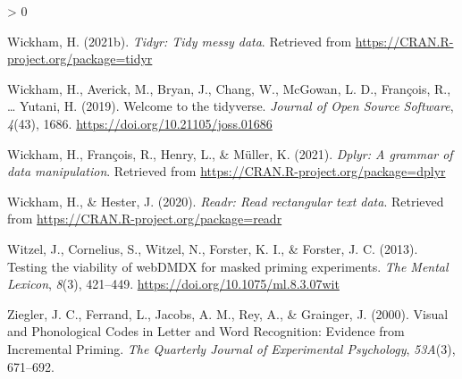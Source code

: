 \documentclass[
  english,
  man]{apa6}
\newlength{\cslhangindent}
\newenvironment{CSLReferences}[2] %
 {%
  \setlength{\parindent}{0pt}
  \ifodd #1 \everypar{\setlength{\hangindent}{\cslhangindent}}\ignorespaces\fi
  \ifnum #2 > 0
  \setlength{\parskip}{#2\baselineskip}
  \fi
 }%
 {}
\begin{document}
\begin{CSLReferences}{1}{0}
\leavevmode\hypertarget{ref-R-tidyr}{}%
Wickham, H. (2021b). \emph{Tidyr: Tidy messy data}. Retrieved from \url{https://CRAN.R-project.org/package=tidyr}

\leavevmode\hypertarget{ref-R-tidyverse}{}%
Wickham, H., Averick, M., Bryan, J., Chang, W., McGowan, L. D., François, R., \ldots{} Yutani, H. (2019). Welcome to the {tidyverse}. \emph{Journal of Open Source Software}, \emph{4}(43), 1686. \url{https://doi.org/10.21105/joss.01686}

\leavevmode\hypertarget{ref-R-dplyr}{}%
Wickham, H., François, R., Henry, L., \& Müller, K. (2021). \emph{Dplyr: A grammar of data manipulation}. Retrieved from \url{https://CRAN.R-project.org/package=dplyr}

\leavevmode\hypertarget{ref-R-readr}{}%
Wickham, H., \& Hester, J. (2020). \emph{Readr: Read rectangular text data}. Retrieved from \url{https://CRAN.R-project.org/package=readr}

\leavevmode\hypertarget{ref-witzelTestingViabilityWebDMDX2013}{}%
Witzel, J., Cornelius, S., Witzel, N., Forster, K. I., \& Forster, J. C. (2013). Testing the viability of {webDMDX} for masked priming experiments. \emph{The Mental Lexicon}, \emph{8}(3), 421--449. \url{https://doi.org/10.1075/ml.8.3.07wit}

\leavevmode\hypertarget{ref-ziegler2000}{}%
Ziegler, J. C., Ferrand, L., Jacobs, A. M., Rey, A., \& Grainger, J. (2000). Visual and Phonological Codes in Letter and Word Recognition: Evidence from Incremental Priming. \emph{The Quarterly Journal of Experimental Psychology}, \emph{53A}(3), 671--692.

\end{CSLReferences}

\endgroup
\end{document}
